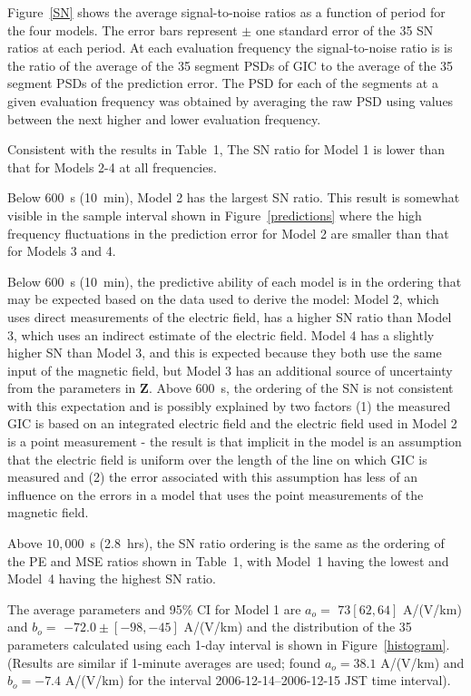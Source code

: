 \documentclass[draft,linenumbers]{agujournal2018}
\begin{document}
Figure~\ref{SN} shows the average signal-to-noise ratios as a function of period for the four models. The error bars represent $\pm$ one standard error of the 35 SN ratios at each period. At each evaluation frequency the signal-to-noise ratio is is the ratio of the average of the 35 segment PSDs of GIC to the average of the 35 segment PSDs of the prediction error. The PSD for each of the segments at a given evaluation frequency was obtained by averaging the raw PSD using values between the next higher and lower evaluation frequency. 

Consistent with the results in Table~1, The SN ratio for Model 1 is lower than that for Models 2-4 at all frequencies. 

Below $600$~s (10~min), Model 2 has the largest SN ratio. This result is somewhat visible in the sample interval shown in Figure~\ref{predictions} where the high frequency fluctuations in the prediction error for Model 2 are smaller than that for Models 3 and 4. 

Below $600$~s (10~min), the predictive ability of each model is in the ordering that may be expected based on the data used to derive the model: Model 2, which uses direct measurements of the electric field, has a higher SN ratio than Model 3, which uses an indirect estimate of the electric field. Model 4 has a slightly higher SN than Model 3, and this is expected because they both use the same input of the magnetic field, but Model 3 has an additional source of uncertainty from the parameters in $\mathbf{Z}$. Above $600$~s, the ordering of the SN is not consistent with this expectation and is possibly explained by two factors (1) the measured GIC is based on an integrated electric field and the electric field used in Model 2 is a point measurement - the result is that implicit in the model is an assumption that the electric field is uniform over the length of the line on which GIC is measured and (2) the error associated with this assumption has less of an influence on the errors in a model that uses the point measurements of the magnetic field.

Above $10,000$~s (2.8~hrs), the SN ratio ordering is the same as the ordering of the PE and MSE ratios shown in Table~1, with Model~1 having the lowest and Model~4 having the highest SN ratio. 

The average parameters and 95\% CI for Model 1 are $a_o = $ $73 [62,64]$ A/(V/km) and $b_o =$ $-72.0 \pm [-98,-45]$ A/(V/km) and the distribution of the 35 parameters calculated using each 1-day interval is shown in Figure~\ref{histogram}. (Results are similar if 1-minute averages are used; \cite{Watari2015} found $a_o=38.1$ A/(V/km) and $b_o=-7.4$ A/(V/km) for the interval 2006-12-14--2006-12-15 JST time interval). 
 
\end{document}
